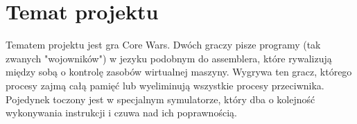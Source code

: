 \chapter{Temat projektu}
Tematem projektu jest gra Core Wars. Dwóch graczy pisze programy (tak zwanych "wojowników") w jezyku podobnym do assemblera, które rywalizują między sobą o kontrolę zasobów wirtualnej maszyny. Wygrywa ten gracz, którego procesy zajmą całą pamięć lub wyeliminują wszystkie procesy przeciwnika. Pojedynek toczony jest w specjalnym symulatorze, który dba o kolejność wykonywania instrukcji i czuwa nad ich poprawnością.